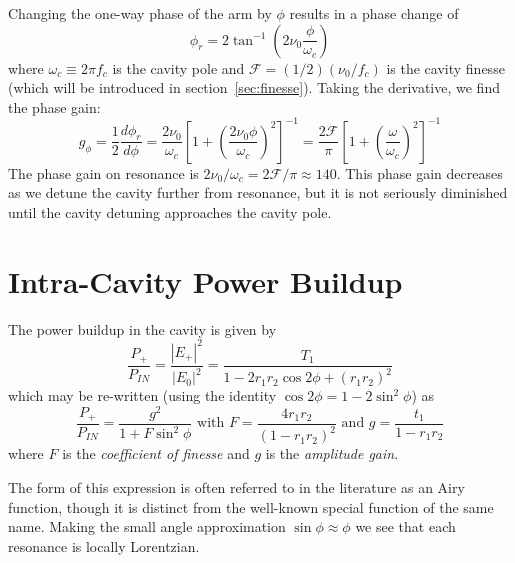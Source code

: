 Changing the one-way phase of the arm by $\phi$ results in a phase 
change of
\begin{equation}
\phi_r   = 2 \tan^{-1} \left( 2 \nu_0 \frac{\phi}{\omega_c} \right)
\end{equation}
where $\omega_c\equiv2\pi f_c$ is the cavity pole and $\mathcal{F}=(1/2)(\nu_0/f_c)$ is the cavity finesse (which will be introduced in section~\ref{sec:finesse}).  Taking the derivative, we find the phase gain:
\begin{equation}
g_\phi =  \frac{1}{2} \frac{d \phi_r}{d \phi} 
= \frac{2 \nu_0}{\omega_c} \left[1 + \left(\frac{2 \nu_0 \phi}{\omega_c}\right)^2 \right]^{-1} 
= \frac{2 \mathcal{F}}{\pi} \left[1 + \left(\frac{\omega}{\omega_c}\right)^2 \right]^{-1} 
\end{equation}
The phase gain on resonance is $2 \nu_0 / \omega_c = 2\mathcal{F}/\pi \approx 140$. This phase gain decreases as we detune the cavity further from resonance, but it is not seriously diminished until the cavity detuning approaches the cavity pole.

\section{Intra-Cavity Power Buildup}

The power buildup in the cavity is given by 
\begin{equation}
\frac{P_+}{P_{IN}} = \frac{|E_+|^2}{|E_0|^2} = \frac{ T_1}{1 - 2 r_1 r_2 \cos 2\phi+\left(r_1 r_2\right)^2 }
\end{equation} 
which may be re-written (using the identity $\cos2\phi = 1 -
2\sin^2\phi$) as
\begin{equation}
\label{cavity_buildup_eq}
\frac{P_+}{P_{IN}} = \frac{g^2}{1 + F \sin^2 \phi} 
\text{  with  } F = \frac{4 r_1 r_2}{(1 - r_1 r_2)^2}
\text{  and  } g = \frac{t_1}{1-r_1 r_2}
\end{equation} 
where $F$ is the \emph{coefficient of finesse} and $g$ is the
\emph{amplitude gain}.

The form of this expression is often referred to in the literature as
an Airy function, though it is distinct from the well-known special
function of the same name.  Making the small angle approximation
$\sin\phi\approx\phi$ we see that each resonance is locally Lorentzian.

